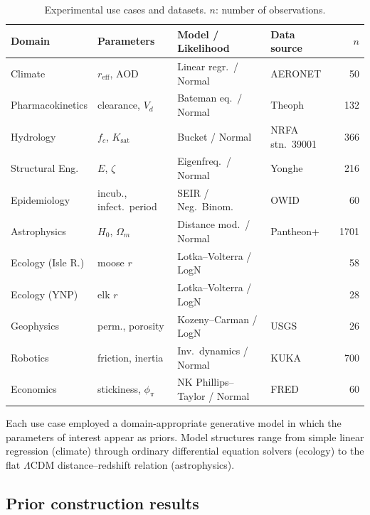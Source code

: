 \documentclass[11pt,a4paper]{article}
\begin{document}
\begin{table}[!htbp]
\centering
\caption{Experimental use cases and datasets. $n$: number of observations.}
\label{tab:usecases}
\footnotesize
\setlength{\tabcolsep}{4pt}
\begin{tabular}{@{}llllr@{}}
  \toprule
  \textbf{Domain} & \textbf{Parameters} & \textbf{Model / Likelihood} & \textbf{Data source} & $n$ \\
  \midrule
  Climate & $r_{\text{eff}}$, AOD & Linear regr.\ / Normal & AERONET \citep{Holben1998} & 50 \\
  Pharmacokinetics & clearance, $V_d$ & Bateman eq.\ / Normal & Theoph \citep{Boeckmann1994} & 132 \\
  Hydrology & $f_c$, $K_{\text{sat}}$ & Bucket / Normal & NRFA stn.\ 39001 & 366 \\
  Structural Eng. & $E$, $\zeta$ & Eigenfreq.\ / Normal & Yonghe \citep{Li2019} & 216 \\
  Epidemiology & incub., infect.\ period & SEIR / Neg.\ Binom. & OWID \citep{Mathieu2021} & 60 \\
  Astrophysics & $H_0$, $\Omega_m$ & Distance mod.\ / Normal & Pantheon+ \citep{Scolnic2022} & 1701 \\
  Ecology (Isle R.) & moose $r$ & Lotka--Volterra / LogN & \citet{Vucetich2012} & 58 \\
  Ecology (YNP) & elk $r$ & Lotka--Volterra / LogN & \citet{Hobbs2023} & 28 \\
  Geophysics & perm., porosity & Kozeny--Carman / LogN & USGS \citep{Nelson2003} & 26 \\
  Robotics & friction, inertia & Inv.\ dynamics / Normal & KUKA \citep{Meier2016} & 700 \\
  Economics & stickiness, $\phi_\pi$ & NK Phillips--Taylor / Normal & FRED \citep{FRED2026} & 60 \\
  \bottomrule
\end{tabular}
\end{table}

\noindent Each use case employed a domain-appropriate generative model in which the parameters of interest appear as priors. Model structures range from simple linear regression (climate) through ordinary differential equation solvers (ecology) to the flat $\Lambda$CDM distance--redshift relation (astrophysics).

\subsection{Prior construction results}
\end{document}

